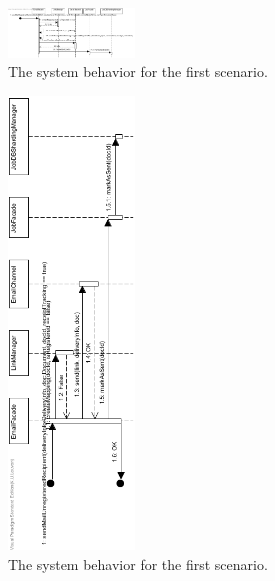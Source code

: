 \documentclass[a4paper,10pt]{article}
\begin{document}
\begin{figure}[!htp]
    \centering
    \includegraphics[width=0.3\textwidth]{SendMailRegisteredRecipient.png}
    \caption{The system behavior for the first scenario.
        }\label{fig:seq_SendMailRegisteredRecipient}
\end{figure}

\begin{figure}[!htp]
    \centering
    \includegraphics[width=0.3\textwidth]{SendMailUnregisteredRecipientReceiptTracking.png}
    \caption{The system behavior for the first scenario.
        }\label{fig:seq_SendMailUnregisteredRecipientReceiptTracking}
\end{figure}
\end{document}
